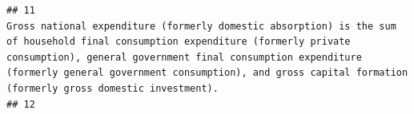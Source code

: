 \documentclass[
]{article}
\begin{document}
\begin{verbatim}
## 11                                                                                                                                                                                                                                                                                                                                                                                                                                                                                                                                                                                                                                                                                                                                                                                                                                                                                                                                                                                                                                                                                                                                     Gross national expenditure (formerly domestic absorption) is the sum of household final consumption expenditure (formerly private consumption), general government final consumption expenditure (formerly general government consumption), and gross capital formation (formerly gross domestic investment).
## 12                                                                                                                                                                                                                                                                                                                                                                                                                                                                                                                                                                                                                                                                                                                                                                                                                                                                                                                                                                                                                                                                                                                                                                                                                                                                                                                                                                                                                                                  

\end{verbatim}
\end{document}
